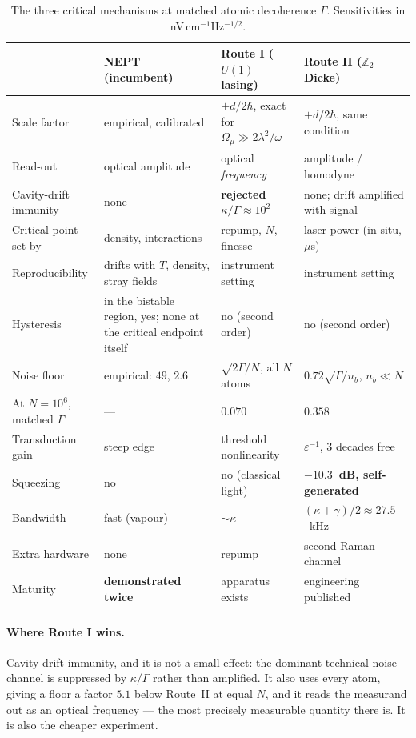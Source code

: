 \documentclass[11pt,a4paper]{article}
\newcommand{\Omu}{\Omega_{\mu}}
\begin{document}
\begin{table}[h]
\centering\small
\renewcommand{\arraystretch}{1.25}
\begin{tabular}{@{}p{3.2cm} p{3.5cm} p{3.5cm} p{4.2cm}@{}}
\toprule
& \textbf{NEPT} (incumbent) & \textbf{Route I} ($U(1)$ lasing) & \textbf{Route II} ($\mathbb{Z}_2$ Dicke)\\
\midrule
Scale factor & empirical, calibrated & $+d/2\hbar$, exact for $\Omu\gg2\lambda^2/\omega$ & $+d/2\hbar$, same condition\\
Read-out & optical amplitude & optical \emph{frequency} & amplitude / homodyne\\
Cavity-drift immunity & none & \textbf{rejected $\kappa/\Gamma\approx10^2$} & none; drift amplified with signal\\
Critical point set by & density, interactions & repump, $N$, finesse & laser power (in situ, $\mu$s)\\
Reproducibility & drifts with $T$, density, stray fields & instrument setting & instrument setting\\
Hysteresis & in the bistable region, yes; none at the critical endpoint itself & no (second order) & no (second order)\\
Noise floor & empirical: $49$, $2.6$ & $\sqrt{2\Gamma/N}$, all $N$ atoms & $0.72\sqrt{\Gamma/n_b}$, $n_b\ll N$\\
At $N=10^6$, matched $\Gamma$ & --- & $0.070$ & $0.358$\\
Transduction gain & steep edge & threshold nonlinearity & $\varepsilon^{-1}$, 3 decades free\\
Squeezing & no & no (classical light) & \textbf{$-10.3$~dB, self-generated}\\
Bandwidth & fast (vapour) & $\sim\kappa$ & $(\kappa+\gamma)/2\approx27.5$~kHz\\
Extra hardware & none & repump & second Raman channel\\
Maturity & \textbf{demonstrated twice} & apparatus exists~\cite{CavitySuperhet2025} & engineering published~\cite{Anisotropic2025}\\
\bottomrule
\end{tabular}
\caption{The three critical mechanisms at matched atomic decoherence $\Gamma$.
Sensitivities in nV\,cm$^{-1}$Hz$^{-1/2}$.}
\label{tab:compare}
\end{table}

\paragraph{Where Route I wins.} Cavity-drift immunity, and it is not a small effect: the
dominant technical noise channel is suppressed by $\kappa/\Gamma$ rather than amplified. It
also uses every atom, giving a floor a factor $5.1$ below Route~II at equal $N$, and it reads
the measurand out as an optical frequency --- the most precisely measurable quantity there is.
It is also the cheaper experiment.
\end{document}

